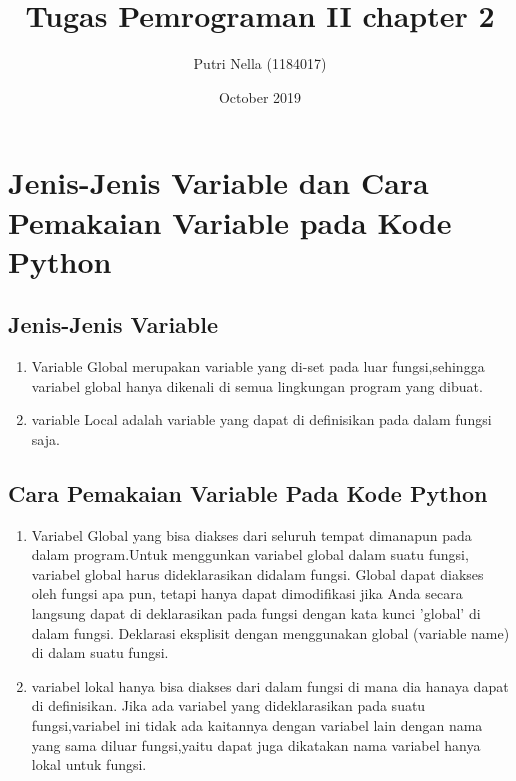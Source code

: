 \documentclass{article}
\title{Tugas Pemrograman II chapter 2}
\author{Putri Nella (1184017) }
\date{October 2019}
\begin{document}
\maketitle

\section{Jenis-Jenis Variable dan Cara Pemakaian Variable pada Kode Python }
\subsection{Jenis-Jenis Variable}
\usepackage{Variabel merupakan lokasi pada memori yang digunakan untuk menyimpan nilai. Pada saat kita akan membuat sebuah variabel, kita ‘memesan’ tempat di dalam pada memori. Tempat tersebut dapat diisi menggunakan data atau objek, baik itu bilangan bulat (integer), pecahan (float), karakter (string), dan lain – lain.Pada Python sendiri terdapat dua jenis variable yaitu:}
\begin{enumerate}
    \item Variable Global merupakan variable yang di-set pada luar fungsi,sehingga variabel global hanya dikenali di semua lingkungan program yang dibuat.
    \item variable Local adalah variable yang dapat  di definisikan pada dalam fungsi saja.
\end{enumerate}
\subsection{Cara Pemakaian Variable Pada Kode Python}
\begin{enumerate}
    \item Variabel Global yang bisa diakses dari seluruh tempat dimanapun pada dalam program.Untuk menggunkan variabel global dalam suatu fungsi, variabel global harus dideklarasikan didalam fungsi. Global dapat diakses oleh fungsi apa pun, tetapi hanya dapat dimodifikasi jika Anda secara langsung dapat di deklarasikan pada fungsi dengan kata kunci ’global’ di dalam fungsi. Deklarasi eksplisit dengan menggunakan global (variable name) di dalam suatu fungsi.
    \item variabel lokal hanya bisa diakses dari dalam fungsi di mana dia hanaya dapat di definisikan. Jika ada variabel yang dideklarasikan pada suatu fungsi,variabel ini tidak ada kaitannya dengan variabel lain dengan nama yang sama
    diluar fungsi,yaitu dapat juga dikatakan nama variabel hanya lokal untuk fungsi.
\end{enumerate}
\end{document}
